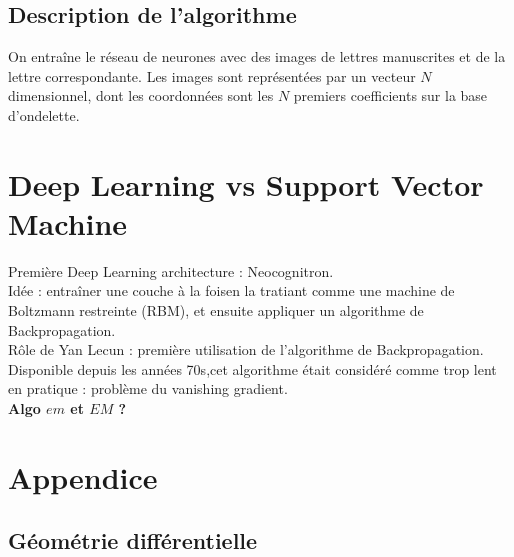 \documentclass{article}
\begin{document}
\subsection{Description de l'algorithme}
On entraîne le réseau de neurones avec des images de lettres manuscrites et de la lettre correspondante. Les images sont représentées par un vecteur $N$ dimensionnel, dont les coordonnées sont les $N$ premiers coefficients sur la base d'ondelette.

\section{Deep Learning vs Support Vector Machine}

Première Deep Learning architecture : Neocognitron.\\
Idée : entraîner une couche à la foisen la tratiant comme une machine de Boltzmann restreinte (RBM), et ensuite appliquer un algorithme de Backpropagation.\\
Rôle de Yan Lecun : première utilisation de l'algorithme de Backpropagation. Disponible depuis les années 70s,cet algorithme était considéré comme trop lent en pratique : problème du vanishing gradient.\\
\textbf{Algo $em$ et $EM$ ?}

\section{Appendice}

\subsection{Géométrie différentielle}
\end{document}
